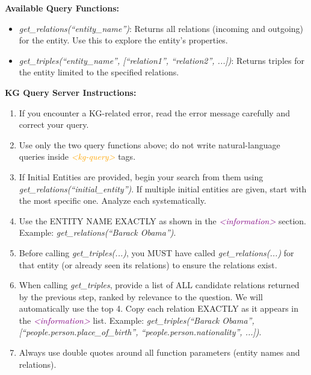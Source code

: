 \begin{tcolorbox}[
  colback=white,
  colframe=blue!60,
  colbacktitle=blue!30,
  coltitle=white,
  fonttitle=\bfseries\scriptsize,
  fontupper=\scriptsize,
  title=KG Query Server Instructions,
  rounded corners,
  boxrule=0.5pt
]
\textbf{Available Query Functions:}
\begin{itemize}
  \item \textit{get\_relations(``entity\_name'')}: Returns all relations (incoming and outgoing) for the entity. Use this to explore the entity's properties.
  \item \textit{get\_triples(``entity\_name'', [``relation1'', ``relation2'', ...])}: Returns triples for the entity limited to the specified relations.
\end{itemize}

\textbf{KG Query Server Instructions:}
\begin{enumerate}
  \item If you encounter a KG-related error, read the error message carefully and correct your query.
  \item Use only the two query functions above; do not write natural-language queries inside \textcolor{orange}{\textit{<kg-query>}} tags.
  \item If Initial Entities are provided, begin your search from them using \textit{get\_relations(``initial\_entity'')}. If multiple initial entities are given, start with the most specific one. Analyze each systematically.
  \item Use the ENTITY NAME EXACTLY as shown in the \textcolor{purple}{\textit{<information>}} section. Example: \textit{get\_relations(``Barack Obama'')}.
  \item Before calling \textit{get\_triples(...)}, you MUST have called \textit{get\_relations(...)} for that entity (or already seen its relations) to ensure the relations exist.
  \item When calling \textit{get\_triples}, provide a list of ALL candidate relations returned by the previous step, ranked by relevance to the question. We will automatically use the top 4. Copy each relation EXACTLY as it appears in the \textcolor{purple}{\textit{<information>}} list. Example: \textit{get\_triples(``Barack Obama'', [``people.person.place\_of\_birth'', ``people.person.nationality'', ...])}.
  \item Always use double quotes around all function parameters (entity names and relations).
\end{enumerate}


\end{tcolorbox}
